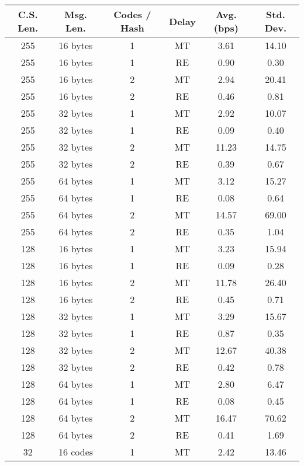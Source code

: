 \documentclass[10pt, conference]{IEEEtran}
\begin{document}
\begin{table*}[ht]
  \centering
  \begin{tabular}{| c | c | c | c | c | c |}
    \hline
    C.S. Len. & Msg. Len. & Codes / Hash & Delay & Avg. (bps) & Std. Dev.\\ \hline \hline
    255 & 16 bytes & 1 & MT & 3.61 & 14.10 \\ \hline
    255 & 16 bytes & 1 & RE & 0.90 & 0.30 \\ \hline
    255 & 16 bytes & 2 & MT & 2.94 & 20.41 \\ \hline
    255 & 16 bytes & 2 & RE & 0.46 & 0.81 \\ \hline
    255 & 32 bytes & 1 & MT & 2.92 & 10.07 \\ \hline
    255 & 32 bytes & 1 & RE & 0.09 & 0.40 \\ \hline
    255 & 32 bytes & 2 & MT & 11.23 & 14.75 \\ \hline
    255 & 32 bytes & 2 & RE & 0.39 & 0.67 \\ \hline
    255 & 64 bytes & 1 & MT & 3.12 & 15.27 \\ \hline
    255 & 64 bytes & 1 & RE  & 0.08 & 0.64 \\ \hline
    255 & 64 bytes & 2 & MT  & 14.57 & 69.00 \\ \hline
    255 & 64 bytes & 2 & RE  & 0.35 & 1.04 \\ \hline
    128 & 16 bytes & 1 & MT & 3.23 & 15.94 \\ \hline
    128 & 16 bytes & 1 & RE & 0.09 & 0.28 \\ \hline
    128 & 16 bytes & 2 & MT & 11.78 & 26.40 \\ \hline
    128 & 16 bytes & 2 & RE & 0.45 & 0.71 \\ \hline
    128 & 32 bytes & 1 & MT & 3.29 & 15.67 \\ \hline
    128 & 32 bytes & 1 & RE  & 0.87 & 0.35 \\ \hline
    128 & 32 bytes & 2 & MT & 12.67 & 40.38 \\ \hline
    128 & 32 bytes & 2 & RE & 0.42 & 0.78 \\ \hline
    128 & 64 bytes & 1 & MT & 2.80 & 6.47 \\ \hline
    128 & 64 bytes & 1 & RE  & 0.08 & 0.45 \\ \hline
    128 & 64 bytes & 2 & MT  & 16.47 & 70.62 \\ \hline
    128 & 64 bytes & 2 & RE & 0.41 & 1.69 \\ \hline
    32 & 16 codes  & 1 & MT & 2.42 & 13.46 \\ \hline

\end{tabular}
\end{table*}
\end{document}
